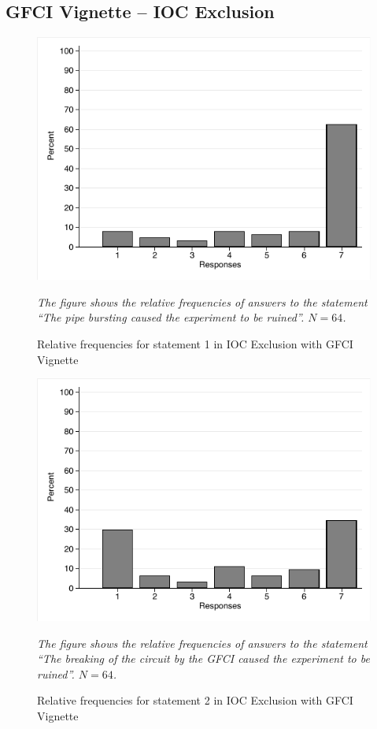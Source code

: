 \documentclass[egregdoesnotlikesansseriftitles,12pt]{scrartcl}
\begin{document}
\subsection{GFCI Vignette -- IOC Exclusion}
\begin{figure}[H]
   \centering
   \includegraphics[scale=0.8]{figures/cir_ioc_hist_1.pdf}
   \begin{minipage}{0.9\linewidth}
   \footnotesize
   \emph{The figure shows the relative frequencies of answers to the statement ``The pipe bursting caused the experiment to be ruined''. $N=64$.}
   \end{minipage}
   \caption{Relative frequencies for statement 1 in IOC Exclusion with GFCI Vignette}
   \label{fig:cir_ioc_hist_1}
\end{figure}

\begin{figure}[H]
   \centering
   \includegraphics[scale=0.8]{figures/cir_ioc_hist_2.pdf}
   \begin{minipage}{0.9\linewidth}
   \footnotesize
   \emph{The figure shows the relative frequencies of answers to the statement ``The breaking of the circuit by the GFCI caused the experiment to be ruined''. $N=64$.}
   \end{minipage}
   \caption{Relative frequencies for statement 2 in IOC Exclusion with GFCI Vignette}
   \label{fig:cir_ioc_hist_2}
\end{figure}
\end{document}
